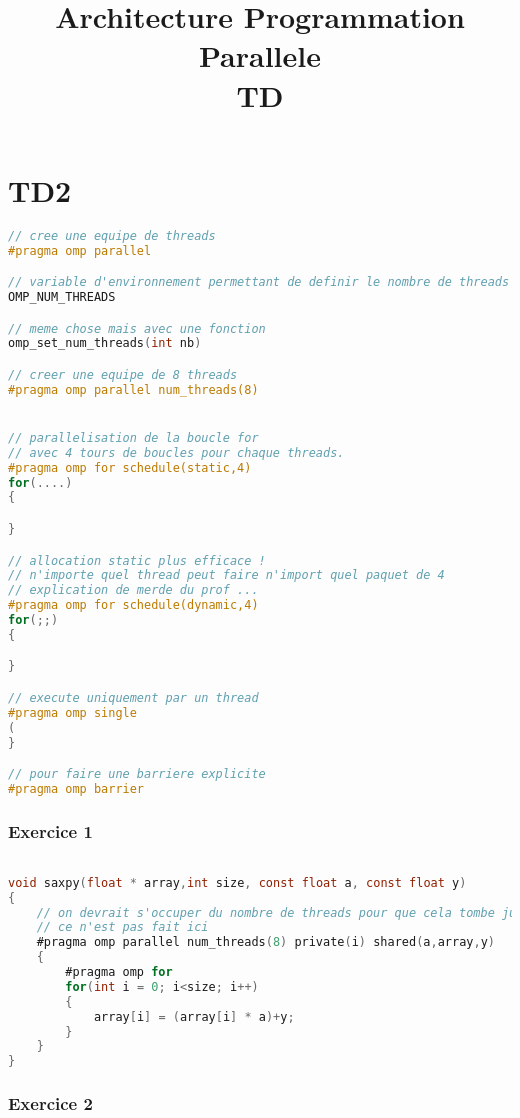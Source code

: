 \documentclass[10pt,a4paper]{article}
\title{Architecture Programmation Parallele\\ TD}
\date{}
\begin{document}
\maketitle

\part*{TD2}

\begin{lstlisting}[language=C]
// cree une equipe de threads
#pragma omp parallel 

// variable d'environnement permettant de definir le nombre de threads pour une equipe.
OMP_NUM_THREADS 

// meme chose mais avec une fonction
omp_set_num_threads(int nb)

// creer une equipe de 8 threads
#pragma omp parallel num_threads(8)


// parallelisation de la boucle for
// avec 4 tours de boucles pour chaque threads.
#pragma omp for schedule(static,4)
for(....)
{

} 

// allocation static plus efficace !
// n'importe quel thread peut faire n'import quel paquet de 4
// explication de merde du prof ...
#pragma omp for schedule(dynamic,4)
for(;;)
{

}

// execute uniquement par un thread
#pragma omp single
(
}

// pour faire une barriere explicite
#pragma omp barrier
\end{lstlisting}


\section*{Exercice 1}

\begin{lstlisting}[language=C]

void saxpy(float * array,int size, const float a, const float y)
{
    // on devrait s'occuper du nombre de threads pour que cela tombe juste avec la taille du tableau
    // ce n'est pas fait ici
    #pragma omp parallel num_threads(8) private(i) shared(a,array,y)
    {
        #pragma omp for 
        for(int i = 0; i<size; i++)
        {
            array[i] = (array[i] * a)+y;
        }
    }
}

\end{lstlisting}

\section*{Exercice 2}
\end{document}
